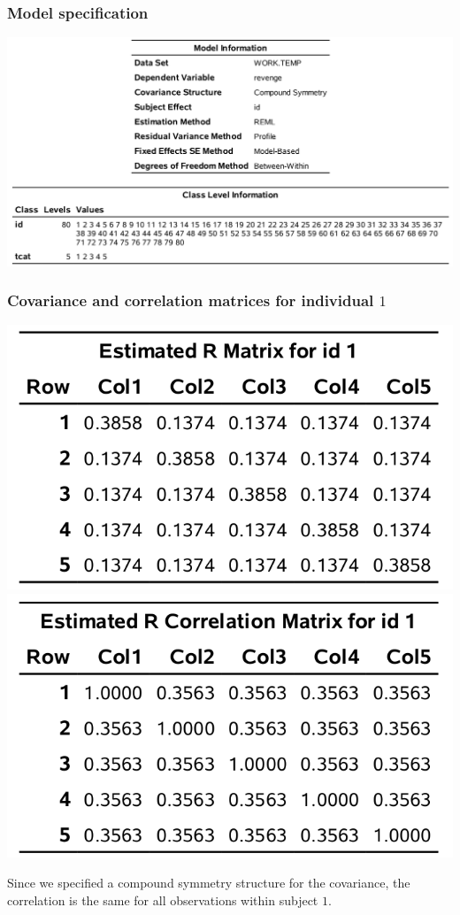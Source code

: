 \documentclass{beamer}
\begin{document}
\begin{frame}[fragile]
\frametitle{Model specification}
\begin{center}
\includegraphics[width = \linewidth]{img/c5/slides6-e06}

\end{center}
\end{frame}

\begin{frame}[fragile]
\frametitle{Covariance and correlation matrices for individual $1$}
\begin{center}
\includegraphics[width = 0.45\linewidth]{img/c5/slides6-e07a}
\includegraphics[width = 0.45\linewidth]{img/c5/slides6-e07b}
\end{center}
Since we specified a compound symmetry structure for the covariance, the correlation is the same for all observations within subject $1$.

\end{frame}
\end{document}
